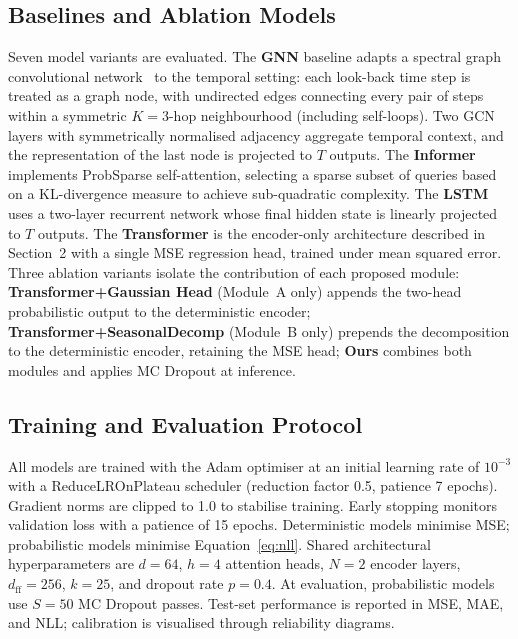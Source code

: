 \documentclass[runningheads]{llncs}
\begin{document}
\subsection{Baselines and Ablation Models}

Seven model variants are evaluated.
The \textbf{GNN} baseline adapts a spectral graph convolutional network~\cite{kipf2017}
to the temporal setting: each look-back time step is treated as a graph node, with
undirected edges connecting every pair of steps within a symmetric $K=3$-hop
neighbourhood (including self-loops).
Two GCN layers with symmetrically normalised adjacency aggregate temporal context,
and the representation of the last node is projected to $T$ outputs.
The \textbf{Informer}~\cite{zhou2021informer} implements ProbSparse self-attention,
selecting a sparse subset of queries based on a KL-divergence measure to achieve
sub-quadratic complexity.
The \textbf{LSTM}~\cite{hochreiter1997} uses a two-layer recurrent network whose
final hidden state is linearly projected to $T$ outputs.
The \textbf{Transformer} is the encoder-only architecture described in
Section~2 with a single MSE regression head, trained under mean squared error.
Three ablation variants isolate the contribution of each proposed module:
\textbf{Transformer+Gaussian Head} (Module~A only) appends the two-head
probabilistic output to the deterministic encoder;
\textbf{Transformer+SeasonalDecomp} (Module~B only) prepends the decomposition
to the deterministic encoder, retaining the MSE head;
\textbf{Ours} combines both modules and applies MC Dropout at inference.

\subsection{Training and Evaluation Protocol}

All models are trained with the Adam optimiser at an initial learning rate of
$10^{-3}$ with a ReduceLROnPlateau scheduler (reduction factor 0.5, patience
7 epochs).
Gradient norms are clipped to 1.0 to stabilise training.
Early stopping monitors validation loss with a patience of 15 epochs.
Deterministic models minimise MSE; probabilistic models minimise
Equation~\eqref{eq:nll}.
Shared architectural hyperparameters are $d = 64$, $h = 4$ attention heads,
$N = 2$ encoder layers, $d_\mathrm{ff} = 256$, $k = 25$, and dropout rate
$p = 0.4$.
At evaluation, probabilistic models use $S = 50$ MC Dropout passes.
Test-set performance is reported in MSE, MAE, and NLL; calibration is
visualised through reliability diagrams.
\end{document}
